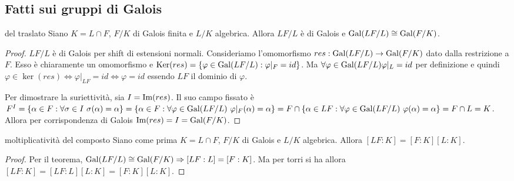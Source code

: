 \subsection{Fatti sui gruppi di Galois}
\begin{minipage}{0.5\textwidth}  
\end{minipage}\hfill
\begin{minipage}{0.5\textwidth}
\begin{theorem}{del traslato}
    Siano $K = L\cap F$, $F/K$ di Galois finita e $L/K$ algebrica. Allora $LF/L$ è di Galois e $\text{Gal}(LF/L) \cong \text{Gal}(F/K)$.
\end{theorem}
\end{minipage}\hfill
\begin{proof}
    $LF/L$ è di Galois per shift di estensioni normali.
    Consideriamo l'omomorfismo $res: \text{Gal}(LF/L) \rightarrow \text{Gal}(F/K)$ dato dalla restrizione a $F$. Esso è chiaramente un omomorfismo e $\text{Ker}(res) = \{ \varphi \in \text{Gal}(LF/L) : \varphi|_F = id \} $. Ma $\forall \varphi \in \text{Gal}(LF/L) \varphi|_L = id$ per definizione e quindi $\varphi \in \ker(res) \iff \varphi|_{LF} = id \iff \varphi = id$ essendo $LF$ il dominio di $\varphi$.
    
    Per dimostrare la suriettività, sia $I = \text{Im}(res)$.
    Il suo campo fissato è $F^I = \{\alpha \in F : \forall \sigma \in I \ \sigma(\alpha) = \alpha \} = \{\alpha \in F : \forall \varphi \in \Gal(LF/L) \ \varphi|_F(\alpha) = \alpha \} = F \cap \{\alpha \in LF : \forall \varphi \in \Gal(LF/L) \ \varphi(\alpha) = \alpha \} = F \cap L = K$. Allora per corrispondenza di Galois $ \text{Im}(res) = I = \text{Gal}(F/K)$. 
\end{proof}
\begin{corollary}{moltiplicatività del composto}
    Siano come prima $K = L\cap F$, $F/K$ di Galois e $L/K$ algebrica. Allora $[LF:K] = [F:K][L:K]$.
\end{corollary}
\begin{proof}
    Per il teorema, $\text{Gal}(LF/L) \cong \text{Gal}(F/K) \Rightarrow [LF:L] = [F:K]$. Ma per torri si ha allora $[LF:K]=[LF:L][L:K] = [F:K][L:K]$. 
\end{proof}
